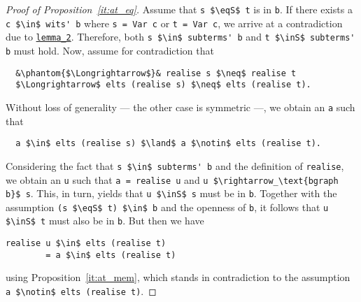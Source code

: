 \documentclass[sigplan,10pt,anonymous,review]{acmart}
\newcommand{\inS}{\in_\text{s}}
\newcommand{\eqS}{=_\text{s}}
\begin{document}
\begin{proof}[Proof of Proposition~\ref{it:at_eq}]
  Assume that \lstinline!s $\eqS$ t! is in \lstinline!b!.
  If there exists a \lstinline!c $\in$ wits' b! where \lstinline!s = Var c! or \lstinline!t = Var c!, we arrive at a contradiction due to \hyperref[lst:lemma_2]{\lstinline!lemma_2!}.
  Therefore, both \lstinline!s $\in$ subterms' b! and \lstinline!t $\inS$ subterms' b! must hold.
  Now, assume for contradiction that
\begin{lstlisting}
  &\phantom{$\Longrightarrow$}& realise s $\neq$ realise t
  $\Longrightarrow$ elts (realise s) $\neq$ elts (realise t).
\end{lstlisting}
  Without loss of generality --- the other case is symmetric ---, we obtain an \lstinline!a! such that
\begin{lstlisting}
  a $\in$ elts (realise s) $\land$ a $\notin$ elts (realise t). 
\end{lstlisting}
  Considering the fact that \lstinline!s $\in$ subterms' b! and the definition of \lstinline!realise!, we obtain an \lstinline!u! such that \lstinline!a = realise u! and \lstinline!u $\rightarrow_\text{bgraph b}$ s!.
  This, in turn, yields that \lstinline!u $\inS$ s! must be in \lstinline!b!.
  Together with the assumption \lstinline!(s $\eqS$ t) $\in$ b! and the openness of \lstinline!b!, it follows that \lstinline!u $\inS$ t! must also be in \lstinline!b!.
  But then we have
\begin{lstlisting}[columns=fixed]
  realise u $\in$ elts (realise t)
        = a $\in$ elts (realise t)
\end{lstlisting}
  using Proposition~\ref{it:at_mem}, which stands in contradiction to the assumption \lstinline!a $\notin$ elts (realise t)!.
\end{proof}
\end{document}
